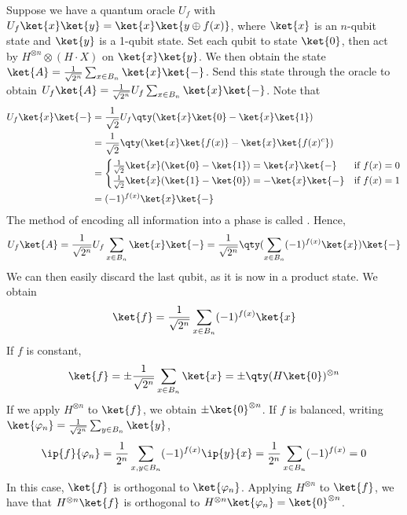 Suppose we have a quantum oracle $U_f$ with $U_f \ket{x} \ket{y} = \ket{x} \ket{y \oplus f(x)}$, where $\ket{x}$ is an $n$-qubit state and $\ket{y}$ is a 1-qubit state.
Set each qubit to state $\ket{0}$, then act by $H^{\otimes n} \otimes (H \cdot X)$ on $\ket{x} \ket{y}$.
We then obtain the state $\ket{A} = \frac{1}{\sqrt{2^n}} \sum_{x \in B_n} \ket{x} \ket{-}$.
Send this state through the oracle to obtain $U_f \ket{A} = \frac{1}{\sqrt{2^n}} U_f \sum_{x \in B_n} \ket{x} \ket{-}$.
Note that
\begin{align*}
    U_f \ket{x} \ket{-} &= \frac{1}{\sqrt{2}} U_f \qty(\ket{x}\ket{0} - \ket{x}\ket{1}) \\
    &= \frac{1}{\sqrt{2}} \qty(\ket{x}\ket{f(x)} - \ket{x}\ket{f(x)^c}) \\
    &= \begin{cases}
        \frac{1}{\sqrt{2}}\ket{x}(\ket{0} - \ket{1}) = \ket{x}\ket{-} & \text{if } f(x) = 0 \\
        \frac{1}{\sqrt{2}}\ket{x}(\ket{1} - \ket{0}) = -\ket{x}\ket{-} & \text{if } f(x) = 1
    \end{cases} \\
    &= (-1)^{f(x)} \ket{x}\ket{-}
\end{align*}
The method of encoding all information into a phase is called .
Hence,
\[ U_f \ket{A} = \frac{1}{\sqrt{2^n}} U_f \sum_{x \in B_n} \ket{x} \ket{-} = \frac{1}{\sqrt{2^n}} \qty(\sum_{x \in B_n} (-1)^{f(x)} \ket{x}) \ket{-} \]
We can then easily discard the last qubit, as it is now in a product state.
We obtain
\[ \ket{f} = \frac{1}{\sqrt{2^n}} \sum_{x \in B_n} (-1)^{f(x)} \ket{x} \]
If $f$ is constant,
\[ \ket{f} = \pm \frac{1}{\sqrt{2^n}} \sum_{x \in B_n} \ket{x} = \pm \qty(H \ket{0})^{\otimes n} \]
If we apply $H^{\otimes n}$ to $\ket{f}$, we obtain $\pm \ket{0}^{\otimes n}$.
If $f$ is balanced, writing $\ket{\varphi_n} = \frac{1}{\sqrt{2^n}} \sum_{y \in B_n} \ket{y}$,
\[ \ip{f}{\varphi_n} = \frac{1}{2^n} \sum_{x, y \in B_n} (-1)^{f(x)} \ip{y}{x} = \frac{1}{2^n} \sum_{x \in B_n} (-1)^{f(x)} = 0 \]
In this case, $\ket{f}$ is orthogonal to $\ket{\varphi_n}$.
Applying $H^{\otimes n}$ to $\ket{f}$, we have that $H^{\otimes n} \ket{f}$ is orthogonal to $H^{\otimes n} \ket{\varphi_n} = \ket{0}^{\otimes n}$.

